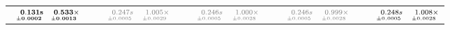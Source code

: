 \documentclass[a4paper,UKenglish]{lipics-v2016}
\begin{document}
\begin{table*}
\begin{adjustbox}{width=1.2\textwidth,center}
\begin{tabular}{rrrp{.1em}rrrp{.1em}rrrp{.1em}rrrp{.1em}rrr}
\cellcolor{black!5}{\tiny \textbf{p$_{6}$}:}&\cellcolor{black!5}$\substack{\mathmakebox[.7cm][r]{\mathbf{0.131}}\mathbf{s}\\{\mathmakebox[.7cm][r]{\scriptscriptstyle \mathbf{\pm 0.0002}}}}$&\cellcolor{black!5}$\substack{\mathmakebox[.7cm][r]{\mathbf{0.533}}\mathbf{\times}\\{\mathmakebox[.7cm][r]{\scriptscriptstyle \mathbf{\pm 0.0013}}}}$&&\cellcolor{black!5}{\tiny \color{gray}{p$_{22}$}:}&\cellcolor{black!5}$\substack{\mathmakebox[.7cm][r]{\color{gray}{0.247}}\color{gray}{s}\\{\mathmakebox[.7cm][r]{\scriptscriptstyle \color{gray}{\pm 0.0005}}}}$&\cellcolor{black!5}$\substack{\mathmakebox[.7cm][r]{\color{gray}{1.005}}\color{gray}{\times}\\{\mathmakebox[.7cm][r]{\scriptscriptstyle \color{gray}{\pm 0.0029}}}}$&&\cellcolor{black!5}{\tiny \color{gray}{p$_{38}$}:}&\cellcolor{black!5}$\substack{\mathmakebox[.7cm][r]{\color{gray}{0.246}}\color{gray}{s}\\{\mathmakebox[.7cm][r]{\scriptscriptstyle \color{gray}{\pm 0.0005}}}}$&\cellcolor{black!5}$\substack{\mathmakebox[.7cm][r]{\color{gray}{1.000}}\color{gray}{\times}\\{\mathmakebox[.7cm][r]{\scriptscriptstyle \color{gray}{\pm 0.0028}}}}$&&\cellcolor{black!5}{\tiny \color{gray}{p$_{54}$}:}&\cellcolor{black!5}$\substack{\mathmakebox[.7cm][r]{\color{gray}{0.246}}\color{gray}{s}\\{\mathmakebox[.7cm][r]{\scriptscriptstyle \color{gray}{\pm 0.0005}}}}$&\cellcolor{black!5}$\substack{\mathmakebox[.7cm][r]{\color{gray}{0.999}}\color{gray}{\times}\\{\mathmakebox[.7cm][r]{\scriptscriptstyle \color{gray}{\pm 0.0028}}}}$&&\cellcolor{black!5}{\tiny p$_{70}$:}&\cellcolor{black!5}$\substack{\mathmakebox[.7cm][r]{0.248}s\\{\mathmakebox[.7cm][r]{\scriptscriptstyle \pm 0.0005}}}$&\cellcolor{black!5}$\substack{\mathmakebox[.7cm][r]{1.008}\times\\{\mathmakebox[.7cm][r]{\scriptscriptstyle \pm 0.0028}}}$\\

\end{tabular}
\end{adjustbox}
\end{table*}
\end{document}

